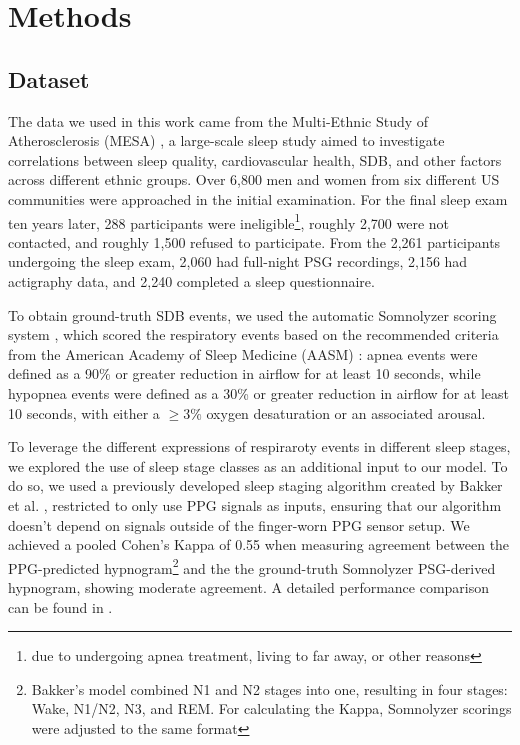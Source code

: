 \chapter{Methods \label{Chapter-Methods}}

\section{Dataset}

The data we used in this work came from the Multi-Ethnic Study of Atherosclerosis (MESA) \cite{chen2015racial}, a large-scale sleep study aimed to investigate correlations between sleep quality, cardiovascular health, SDB, and other factors across different ethnic groups.
Over 6,800 men and women from six different US communities were approached in the initial examination. For the final sleep exam ten years later, 288 participants were ineligible\footnote{due to undergoing apnea treatment, living to far away, or other reasons}, roughly 2,700 were not contacted, and roughly 1,500 refused to participate. From the 2,261 participants undergoing the sleep exam, 2,060 had full-night PSG recordings, 2,156 had actigraphy data, and 2,240 completed a sleep questionnaire.

To obtain ground-truth SDB events, we used the automatic Somnolyzer scoring system \cite{anderer2022automated}, which scored the respiratory events based on the recommended criteria from the American Academy of Sleep Medicine (AASM) \cite{troester2023aasm}: apnea events were defined as a 90\% or greater reduction in airflow for at least 10 seconds, while hypopnea events were defined as a 30\% or greater reduction in airflow for at least 10 seconds, with either a $\geq 3\%$ oxygen desaturation or an associated arousal.

To leverage the different expressions of respiraroty events in different sleep stages, we explored the use of sleep stage classes as an additional input to our model. To do so, we used a previously developed sleep staging algorithm created by Bakker et al. \cite{bakker2021estimating}, restricted to only use PPG signals as inputs, ensuring that our algorithm doesn't depend on signals outside of the finger-worn PPG sensor setup.
We achieved a pooled Cohen's Kappa of 0.55 when measuring agreement between the PPG-predicted hypnogram\footnote{Bakker's model combined N1 and N2 stages into one, resulting in four stages: Wake, N1/N2, N3, and REM. For calculating the Kappa, Somnolyzer scorings were adjusted to the same format} and the the ground-truth Somnolyzer PSG-derived hypnogram, showing moderate agreement. A detailed performance comparison can be found in .

